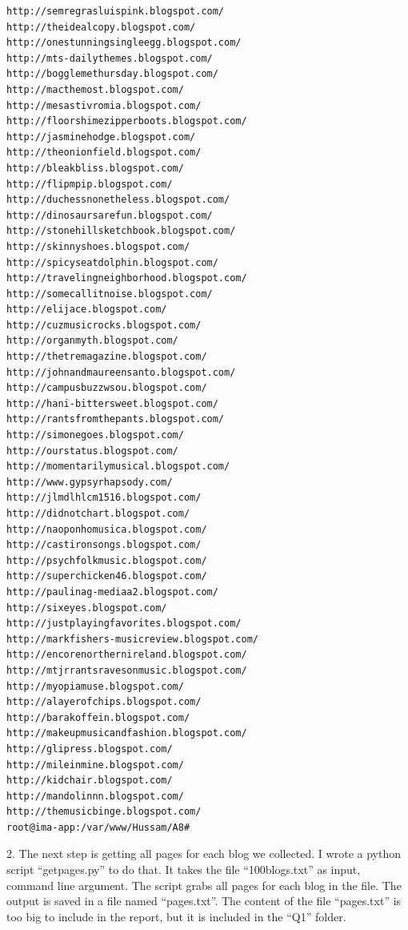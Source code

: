 \documentclass[a4paper, 11pt]{article}
\begin{document}
\begin{lstlisting}[language=bash, breakatwhitespace=〈false), label=Running getblogurls.py, caption=Running getblogurls.py]
http://semregrasluispink.blogspot.com/
http://theidealcopy.blogspot.com/
http://onestunningsingleegg.blogspot.com/
http://mts-dailythemes.blogspot.com/
http://bogglemethursday.blogspot.com/
http://macthemost.blogspot.com/
http://mesastivromia.blogspot.com/
http://floorshimezipperboots.blogspot.com/
http://jasminehodge.blogspot.com/
http://theonionfield.blogspot.com/
http://bleakbliss.blogspot.com/
http://flipmpip.blogspot.com/
http://duchessnonetheless.blogspot.com/
http://dinosaursarefun.blogspot.com/
http://stonehillsketchbook.blogspot.com/
http://skinnyshoes.blogspot.com/
http://spicyseatdolphin.blogspot.com/
http://travelingneighborhood.blogspot.com/
http://somecallitnoise.blogspot.com/
http://elijace.blogspot.com/
http://cuzmusicrocks.blogspot.com/
http://organmyth.blogspot.com/
http://thetremagazine.blogspot.com/
http://johnandmaureensanto.blogspot.com/
http://campusbuzzwsou.blogspot.com/
http://hani-bittersweet.blogspot.com/
http://rantsfromthepants.blogspot.com/
http://simonegoes.blogspot.com/
http://ourstatus.blogspot.com/
http://momentarilymusical.blogspot.com/
http://www.gypsyrhapsody.com/
http://jlmdlhlcm1516.blogspot.com/
http://didnotchart.blogspot.com/
http://naoponhomusica.blogspot.com/
http://castironsongs.blogspot.com/
http://psychfolkmusic.blogspot.com/
http://superchicken46.blogspot.com/
http://paulinag-mediaa2.blogspot.com/
http://sixeyes.blogspot.com/
http://justplayingfavorites.blogspot.com/
http://markfishers-musicreview.blogspot.com/
http://encorenorthernireland.blogspot.com/
http://mtjrrantsravesonmusic.blogspot.com/
http://myopiamuse.blogspot.com/
http://alayerofchips.blogspot.com/
http://barakoffein.blogspot.com/
http://makeupmusicandfashion.blogspot.com/
http://glipress.blogspot.com/
http://mileinmine.blogspot.com/
http://kidchair.blogspot.com/
http://mandolinnn.blogspot.com/
http://themusicbinge.blogspot.com/
root@ima-app:/var/www/Hussam/A8#
\end{lstlisting}


2. The next step is getting all pages for each blog we collected. I wrote a python script ``getpages.py'' to do that. It takes the file ``100blogs.txt'' as input, command line argument. The script grabs all pages for each blog in the file. The output is saved in a file named ``pages.txt''. The content of the file ``pages.txt'' is too big to include in the report, but it is included in the ``Q1'' folder.


\end{document}
